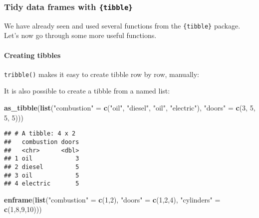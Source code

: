 \documentclass[
]{article}
\newenvironment{Shaded}{\begin{snugshade}}{\end{snugshade}}
\newcommand{\DecValTok}[1]{\textcolor[rgb]{0.00,0.00,0.81}{#1}}
\newcommand{\KeywordTok}[1]{\textcolor[rgb]{0.13,0.29,0.53}{\textbf{#1}}}
\newcommand{\NormalTok}[1]{#1}
\newcommand{\StringTok}[1]{\textcolor[rgb]{0.31,0.60,0.02}{#1}}
\begin{document}
\hypertarget{tidy-data-frames-with-tibble}{%
\subsubsection{\texorpdfstring{Tidy data frames with \texttt{\{tibble\}}}{Tidy data frames with \{tibble\}}}\label{tidy-data-frames-with-tibble}}

We have already seen and used several functions from the \texttt{\{tibble\}} package. Let's now go through
some more useful functions.

\hypertarget{creating-tibbles}{%
\paragraph{Creating tibbles}\label{creating-tibbles}}

\texttt{tribble()} makes it easy to create tibble row by row, manually:

It is also possible to create a tibble from a named list:

\begin{Shaded}
\begin{Highlighting}[]
\KeywordTok{as\_tibble}\NormalTok{(}\KeywordTok{list}\NormalTok{(}\StringTok{"combustion"}\NormalTok{ =}\StringTok{ }\KeywordTok{c}\NormalTok{(}\StringTok{"oil"}\NormalTok{, }\StringTok{"diesel"}\NormalTok{, }\StringTok{"oil"}\NormalTok{, }\StringTok{"electric"}\NormalTok{),}
               \StringTok{"doors"}\NormalTok{ =}\StringTok{ }\KeywordTok{c}\NormalTok{(}\DecValTok{3}\NormalTok{, }\DecValTok{5}\NormalTok{, }\DecValTok{5}\NormalTok{, }\DecValTok{5}\NormalTok{)))}
\end{Highlighting}
\end{Shaded}

\begin{verbatim}
## # A tibble: 4 x 2
##   combustion doors
##   <chr>      <dbl>
## 1 oil            3
## 2 diesel         5
## 3 oil            5
## 4 electric       5
\end{verbatim}

\begin{Shaded}
\begin{Highlighting}[]
\KeywordTok{enframe}\NormalTok{(}\KeywordTok{list}\NormalTok{(}\StringTok{"combustion"}\NormalTok{ =}\StringTok{ }\KeywordTok{c}\NormalTok{(}\DecValTok{1}\NormalTok{,}\DecValTok{2}\NormalTok{), }\StringTok{"doors"}\NormalTok{ =}\StringTok{ }\KeywordTok{c}\NormalTok{(}\DecValTok{1}\NormalTok{,}\DecValTok{2}\NormalTok{,}\DecValTok{4}\NormalTok{), }\StringTok{"cylinders"}\NormalTok{ =}\StringTok{ }\KeywordTok{c}\NormalTok{(}\DecValTok{1}\NormalTok{,}\DecValTok{8}\NormalTok{,}\DecValTok{9}\NormalTok{,}\DecValTok{10}\NormalTok{)))}
\end{Highlighting}
\end{Shaded}
\end{document}
